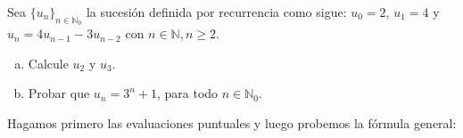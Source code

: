 \begin{problem}{}{}

    Sea ${\{ u_n \}}_{n \in \mathbb{N}_0}$ la sucesión definida por recurrencia como sigue:
    $u_0 = 2$, $u_1 = 4$ y $u_n = 4 u_{n-1} - 3 u_{n-2}$ con $n \in \mathbb{N}, n\ge 2$.

    \begin{enumerate}[(a)]
        \item Calcule $u_2$ y $u_3$.
        \item Probar que $u_n = 3^n + 1$, para todo $n \in \mathbb{N}_0$.
    \end{enumerate}

\end{problem}
\vspace{1ex}

Hagamos primero las evaluaciones puntuales y luego probemos la fórmula general:

